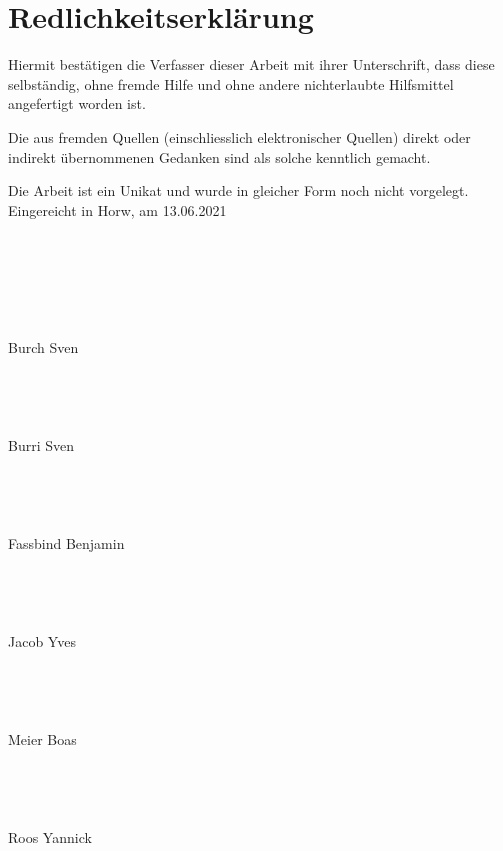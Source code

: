 \newpage
\section*{Redlichkeitserklärung}
\thispagestyle{empty}

 
Hiermit bestätigen die Verfasser dieser Arbeit mit ihrer Unterschrift, dass diese selbständig, ohne fremde Hilfe und ohne andere nichterlaubte Hilfsmittel angefertigt worden ist. 

 

Die aus fremden Quellen (einschliesslich elektronischer Quellen) direkt oder indirekt übernommenen Gedanken sind als solche kenntlich gemacht. 

 

Die Arbeit ist ein Unikat und wurde in gleicher Form noch nicht vorgelegt.\\

 

Eingereicht in Horw, am 13.06.2021
\\
\\
\\
\\
\\
\\
\\
Burch Sven
\\
\\
\\
\\
\\
Burri Sven
\\
\\
\\
\\
\\
Fassbind Benjamin
\\
\\
\\
\\
\\
Jacob Yves
\\
\\
\\
\\
\\
Meier Boas
\\
\\
\\
\\
\\
Roos Yannick